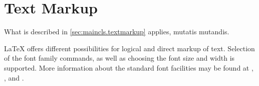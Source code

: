 \section{Text Markup}
%
\IgnoreThisfalse
\ifshortversion\IgnoreThistrue\ifCommonmaincls\IgnoreThisfalse\fi\fi%
\ifIgnoreThis %
What is described in
\autoref{sec:maincls.textmarkup} applies, mutatis mutandis.
\else %
%
%

{\LaTeX} offers different possibilities for logical and direct
markup of text.
Selection of the
font family commands, as well as choosing the font size and width is
supported. More information about the standard font facilities may be found at
\cite{lshort}, \cite{latex:usrguide}, and \cite{latex:fntguide}.


